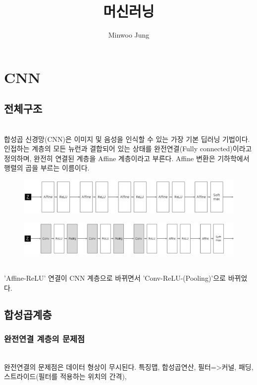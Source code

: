\documentclass[11pt]{article}
\title{머신러닝}
\author{Minwoo Jung}
\begin{document}
\maketitle

\section{CNN}

\subsection{전체구조}

\indent \\합성곱 신경망(CNN)은 이미지 및 음성을 인식할 수 있는 가장 기본 딥러닝 기법이다. 인접하는 계층의 모든 뉴런과 결합되어 있는 상태를 완전연결(Fully connected)이라고 정의하며, 완전히 연결된 계층을 Affine 계층이라고 부른다. Affine 변환은 기하학에서 행렬의 곱을 부르는 이름이다. 
	\begin{figure}
		\includegraphics[width=1\columnwidth]{../Figure/Figure_1.pdf}
	\end{figure}
    \begin{figure}
		\includegraphics[width=1\columnwidth]{../Figure/Figure_2.pdf}
	\end{figure}	
\indent \\'Affine-ReLU' 연결이 CNN 계층으로 바뀌면서 'Conv-ReLU-(Pooling)'으로 바뀌었다.

\subsection{합성곱계층}

\subsubsection{완전연결 계층의 문제점}
\indent \\완전연결의 문제점은 데이터 형상이 무시된다. 특징맵, 합성곱연산, 필터=>커널, 패딩, 스트라이드(필터를 적용하는 위치의 간격),
\end{document}
